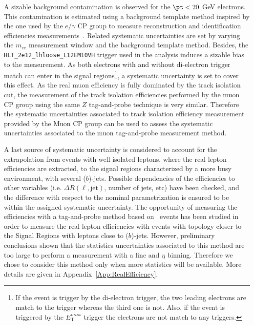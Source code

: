 A sizable background contamination is observed for the $\pt < 20$ GeV electrons. This contamination is estimated using a background template method inspired by the one used by the $e/\gamma$ CP group to measure reconstruction and identification efficiencies measurements~\cite{ATLAS-CONF-2014-032}. Related systematic uncertainties are set by varying the $m_{ee}$ measurement window and the background template method. Besides, the \texttt{HLT\_2e12\_lhloose\_L12EM10VH} trigger used in the analysis induces a sizable bias to the measurement. As both electrons with and without di-electron trigger match can enter in the signal regions\footnote{If the event is trigger by the di-electron trigger, the two leading electrons are match to the trigger whereas the third one is not. Also, if the event is triggered by the $E_{\mathrm{T}}^{miss}$ trigger the electrons are not match to any triggers.}, a systematic uncertainty is set to cover this effect. As the real muon efficiency is fully dominated by the track isolation cut, the measurement of the track isolation efficiencies performed by the muon CP group using the same $Z$ tag-and-probe technique is very similar. Therefore the systematic uncertainties associated to track isolation efficiency measurement provided by the Muon CP group can be used to assess the systematic uncertainties associated to the muon tag-and-probe measurement method.

A last source of systematic uncertainty is considered to account for the extrapolation from events with well isolated leptons, where the real lepton efficiencies are extracted, to the signal regions characterized by a more busy environment, with several ($b$)-jets. Possible dependencies of the efficiencies to other variables (i.e. $\Delta R(\ell, \text{jet})$, number of jets, etc) have been checked, and the difference with respect to the nominal parametrization is ensured to be within the assigned systematic uncertainty. The opportunity of measuring the efficiencies with a tag-and-probe method based on \ttbar\ events has been studied in order to measure the real lepton efficiencies with events with topology closer to the Signal Regions with leptons close to ($b$)-jets. However, preliminary conclusions shown that the statistics uncertainties associated to this method are too large to perform a measurement with a fine \pt and $\eta$ binning. Therefore we chose to consider this method only when more statistics will be available. More details are given in Appendix~\ref{App:RealEfficiency}. \\


